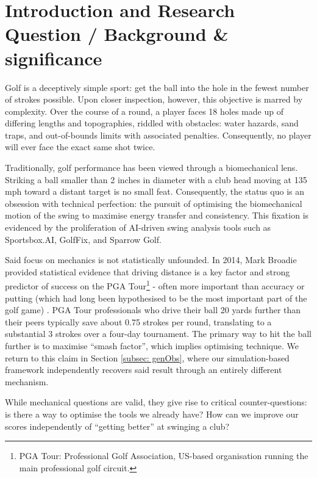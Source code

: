 \documentclass[11pt, letterpaper]{article}
\begin{document}
\newpage
\setcounter{page}{1} %

\section{Introduction and Research Question / Background \& significance}
\label{sec: Intro}

Golf is a deceptively simple sport: get the ball into the hole in the fewest number of strokes possible. Upon closer inspection, however, this objective is marred by complexity. Over the course of a round, a player faces 18 holes made up of differing lengths and topographies, riddled with obstacles: water hazards, sand traps, and out-of-bounds limits with associated penalties. Consequently, no player will ever face the exact same shot twice.

Traditionally, golf performance has been viewed through a biomechanical lens. Striking a ball smaller than 2 inches in diameter with a club head moving at 135 mph toward a distant target is no small feat. Consequently, the status quo is an obsession with technical perfection: the pursuit of optimising the biomechanical motion of the swing to maximise energy transfer and consistency. This fixation is evidenced by the proliferation of AI-driven swing analysis tools such as Sportsbox.AI, GolfFix, and Sparrow Golf. \newcite

Said focus on mechanics is not statistically unfounded. In 2014, Mark Broadie provided statistical evidence that driving distance is a key factor and strong predictor of success on the PGA Tour\footnote{PGA Tour: Professional Golf Association, US-based organisation running the main professional golf circuit.} - often more important than accuracy or putting (which had long been hypothesised to be the most important part of the golf game) \parencite{Broadie_2014a}. PGA Tour professionals who drive their ball 20 yards further than their peers typically save about 0.75 strokes per round, translating to a substantial 3 strokes over a four-day tournament. The primary way to hit the ball further is to maximise ``smash factor'', which implies optimising technique. We return to this claim in Section \ref{subsec: genObs}, where our simulation-based framework independently recovers said result through an entirely different mechanism. 

While mechanical questions are valid, they give rise to critical counter-questions: is there a way to optimise the tools we already have? How can we improve our scores independently of ``getting better'' at swinging a club? 
\end{document}
